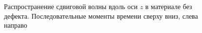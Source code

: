 \begin{figure}%
	\caption{Распространение сдвиговой волны вдоль оси $z$ в материале без дефекта. Последовательные моменты времени сверху вниз, слева направо}
	\label{pic:s-wave}
\end{figure}

